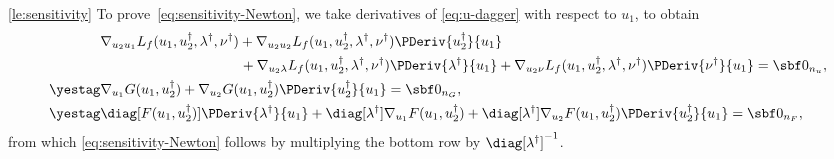 \documentclass[11pt]{article}
\begin{document}
\begin{proof-lemma}{\ref{le:sensitivity}}
  To prove~\eqref{eq:sensitivity-Newton}, we take derivatives of
  \eqref{eq:u-dagger} with respect to $u_1$, to obtain
  \begin{align*}
    &\nabla_{u_2u_1} L_f(u_1,u_2^\dagger,\lambda^\dagger,\nu^\dagger)
    +\nabla_{u_2u_2} L_f(u_1,u_2^\dagger,\lambda^\dagger,\nu^\dagger)\PDeriv{u_2^\dagger}{u_1}\\&\hspace*{10em}
    +\nabla_{u_2\lambda} L_f(u_1,u_2^\dagger,\lambda^\dagger,\nu^\dagger)\PDeriv{\lambda^\dagger}{u_1}
    +\nabla_{u_2\nu} L_f(u_1,u_2^\dagger,\lambda^\dagger,\nu^\dagger)\PDeriv{\nu^\dagger}{u_1}
    =\sbf 0_{n_u}, \\
    \yestag\label{eq:G-dagger}
    &\nabla_{u_1} G(u_1,u_2^\dagger)+\nabla_{u_2} G(u_1,u_2^\dagger)\PDeriv{u_2^\dagger}{u_1}
    =\sbf 0_{n_G}, \\
    \yestag\label{eq:F-dagger}
    &
    \diag[F(u_1,u_2^\dagger)]\PDeriv{\lambda^\dagger}{u_1}
    +
    \diag[\lambda^\dagger] \nabla_{u_1} F(u_1,u_2^\dagger)
    +\diag[\lambda^\dagger] \nabla_{u_2} F(u_1,u_2^\dagger)\PDeriv{u_2^\dagger}{u_1}
    =\sbf 0_{n_F},
  \end{align*}
  from which \eqref{eq:sensitivity-Newton} follows by multiplying the
  bottom row by $\diag[\lambda^\dagger]^{-1}$.

  \medskip


\end{proof-lemma}
\end{document}
